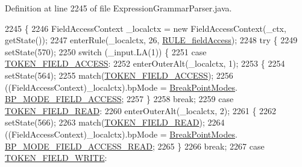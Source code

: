 Definition at line 2245 of file Expression\+Grammar\+Parser.\+java.


\begin{DoxyCode}
2245                                                                             \{
2246     FieldAccessContext \_localctx = \textcolor{keyword}{new} FieldAccessContext(\_ctx, getState());
2247     enterRule(\_localctx, 26, \hyperlink{classgov_1_1nasa_1_1jpf_1_1inspector_1_1server_1_1expression_1_1parser_1_1_expression_grammar_parser_aff521471074311ffd012adc4b7330ad0}{RULE\_fieldAccess});
2248     \textcolor{keywordflow}{try} \{
2249       setState(570);
2250       \textcolor{keywordflow}{switch} (\_input.LA(1)) \{
2251       \textcolor{keywordflow}{case} \hyperlink{classgov_1_1nasa_1_1jpf_1_1inspector_1_1server_1_1expression_1_1parser_1_1_expression_grammar_parser_a4d10f0bd0fd32a8126a088118c9da5d9}{TOKEN\_FIELD\_ACCESS}:
2252         enterOuterAlt(\_localctx, 1);
2253         \{
2254         setState(564);
2255         match(\hyperlink{classgov_1_1nasa_1_1jpf_1_1inspector_1_1server_1_1expression_1_1parser_1_1_expression_grammar_parser_a4d10f0bd0fd32a8126a088118c9da5d9}{TOKEN\_FIELD\_ACCESS});
2256          ((FieldAccessContext)\_localctx).bpMode =  \hyperlink{enumgov_1_1nasa_1_1jpf_1_1inspector_1_1server_1_1breakpoints_1_1_break_point_modes}{BreakPointModes}.
      \hyperlink{enumgov_1_1nasa_1_1jpf_1_1inspector_1_1server_1_1breakpoints_1_1_break_point_modes_ae4e756a4d9098476882df84124266b8b}{BP\_MODE\_FIELD\_ACCESS}; 
2257         \}
2258         \textcolor{keywordflow}{break};
2259       \textcolor{keywordflow}{case} \hyperlink{classgov_1_1nasa_1_1jpf_1_1inspector_1_1server_1_1expression_1_1parser_1_1_expression_grammar_parser_a8f5b02cf5f44f22ac181bc2a7a2d2817}{TOKEN\_FIELD\_READ}:
2260         enterOuterAlt(\_localctx, 2);
2261         \{
2262         setState(566);
2263         match(\hyperlink{classgov_1_1nasa_1_1jpf_1_1inspector_1_1server_1_1expression_1_1parser_1_1_expression_grammar_parser_a8f5b02cf5f44f22ac181bc2a7a2d2817}{TOKEN\_FIELD\_READ});
2264          ((FieldAccessContext)\_localctx).bpMode =  \hyperlink{enumgov_1_1nasa_1_1jpf_1_1inspector_1_1server_1_1breakpoints_1_1_break_point_modes}{BreakPointModes}.
      \hyperlink{enumgov_1_1nasa_1_1jpf_1_1inspector_1_1server_1_1breakpoints_1_1_break_point_modes_ab6a4f07b54aa0a40c932b7975934e15f}{BP\_MODE\_FIELD\_ACCESS\_READ}; 
2265         \}
2266         \textcolor{keywordflow}{break};
2267       \textcolor{keywordflow}{case} \hyperlink{classgov_1_1nasa_1_1jpf_1_1inspector_1_1server_1_1expression_1_1parser_1_1_expression_grammar_parser_a3b7cc9e131d6af08fb7faae2ef95b938}{TOKEN\_FIELD\_WRITE}:

\end{DoxyCode}
